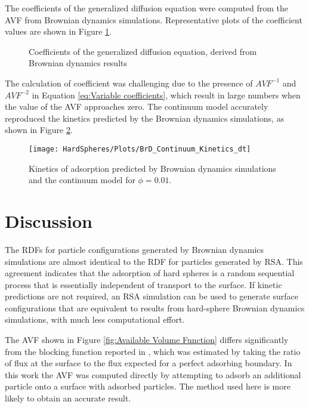 The coefficients of the generalized diffusion equation were computed
from the AVF from Brownian dynamics simulations. Representative plots
of the coefficient values are shown in Figure \ref{fig:Coefficient Plots}.%
\begin{figure}[H]

\caption{\label{fig:Coefficient Plots}Coefficients of the generalized diffusion
equation, derived from Brownian dynamics results}
%
\end{figure}
 The calculation of coefficient was challenging due to the presence
of $AVF^{-1}$ and $AVF^{-2}$ in Equation \ref{eq:Variable coefficients},
which result in large numbers when the value of the AVF approaches
zero. The continuum model accurately reproduced the kinetics predicted
by the Brownian dynamics simulations, as shown in Figure \ref{fig:Kinetics CFD BrD}.%
\begin{figure}
\texttt{[image: HardSpheres/Plots/BrD\_Continuum\_Kinetics\_dt]}

\caption{\label{fig:Kinetics CFD BrD}Kinetics of adsorption predicted by Brownian
dynamics simulations and the continuum model for $\phi=0.01$.}
%
\end{figure}



\section{Discussion}

The RDFs for particle configurations generated by Brownian dynamics
simulations are almost identical to the RDF for particles generated
by RSA. This agreement indicates that the adsorption of hard spheres
is a random sequential process that is essentially independent of
transport to the surface. If kinetic predictions are not required,
an RSA simulation can be used to generate surface configurations that
are equivalent to results from hard-sphere Brownian dynamics simulations,
with much less computational effort.

The AVF shown in Figure \ref{fig:Available Volume Function} differs
significantly from the blocking function reported in \cite{Magan2004},
which was estimated by taking the ratio of flux at the surface to
the flux expected for a perfect adsorbing boundary. In this work the
AVF was computed directly by attempting to adsorb an additional particle
onto a surface with adsorbed particles. The method used here is more
likely to obtain an accurate result.
